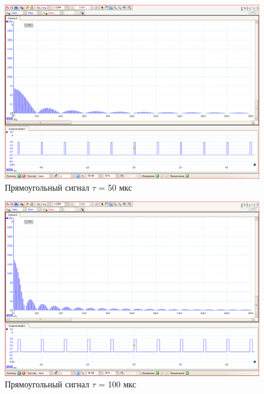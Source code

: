\documentclass[a4paper]{article}
\begin{document}
\begin{figure}[h!]
    \centering
    \includegraphics[width=0.5\pdfpagewidth]{Прямоугольный сигнал 1кГц 50 мкс.PNG}
    \caption{Прямоугольный сигнал $\tau$ = 50 мкс}
\end{figure}

\begin{figure}[h!]
    \centering
    \includegraphics[width=0.5\pdfpagewidth]{Прямоугольный сигнал 1кГц 100 мкс.PNG}
    \caption{Прямоугольный сигнал $\tau$ = 100 мкс}
\end{figure}
\end{document}
